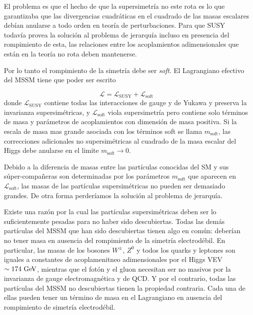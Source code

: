 El problema es que el hecho de que la supersimetría no este rota es lo que garantizaba que las
divergencias cuadráticas en el cuadrado de las masas escalares debían anularse a todo orden en
teoría de perturbaciones.
Para que SUSY todavía provea la solución al problema de jerarquía incluso en presencia del rompimiento
de esta, las relaciones entre los acoplamientos adimensionales que están en la teoría
no rota deben mantenerse. %

Por lo tanto el rompimiento de la simetría debe ser \emph{soft}. El Lagrangiano efectivo del MSSM tiene
que poder ser escrito

\begin{equation}
  \mathcal{L} = \mathcal{L}_\text{SUSY} + \mathcal{L}_\text{soft}
\end{equation}
%
donde $\mathcal{L}_\text{SUSY}$ contiene todas las interacciones de gauge y de Yukawa y preserva la
invarianza supersimétricas, y $\mathcal{L}_\text{soft}$ viola supersimetría pero contiene solo
términos de masa y parámetros de acoplamientos con dimensión de masa positiva.
Si la escala de masa mas grande asociada  con los términos soft se llama $m_\text{soft}$, las
correcciones adicionales no supersimétricas al cuadrado de la masa escalar del Higgs debe anularse en
el limite $m_\text{soft} \to 0$.

Debido a la diferencia de masas entre las partículas conocidas del SM y sus súper-compañeras son
determinadas por los parámetros $m_\text{soft}$ que aparecen en $\mathcal{L}_\text{soft}$, las masas
de las partículas supersimétricas no pueden ser demasiado grandes. De otra forma perderíamos la
solución al problema de jerarquía.

Existe una razón por la cual las partículas supersimétricas deben ser lo suficientemente pesadas para
no haber sido descubiertas. Todas las demás partículas del MSSM que han sido descubiertas tienen algo
en com\'un: deberían no tener masa en ausencia del rompimiento de la simetría electrodébil. En
particular, las masas de los bosones $W^\pm$, $Z^0$ y todos los quarks y leptones son iguales a constantes
de acoplamenitneo adimensionales por el Higgs VEV $\sim 174 \gev$, mientras que el fotón y el gluon
necesitan ser no masivos por la invarianza de gauge electromagnética y de QCD. Y por el contrario,
todas las partículas del MSSM no descubiertas tienen la propiedad contraria. Cada una de ellas pueden
tener un término de masa en el Lagrangiano en ausencia del rompimiento de simetría electrodébil.

